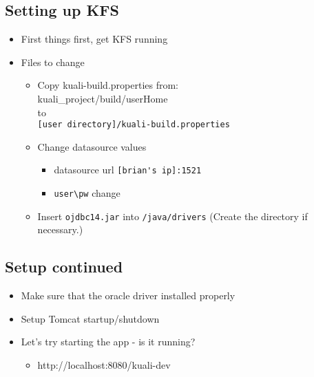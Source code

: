     \W \begin{s5slide}
        \W \section{Setting up KFS}
        \begin{ifhtml}
            \begin{itemize}
                \item First things first, get KFS running
                \item Files to change
                \begin{itemize}
                    \item Copy kuali-build.properties from: \\
                    kuali_project/build/userHome  \\
                    to \\
                    \verb|[user directory]/kuali-build.properties| \\
                    \item Change datasource values
                    	\begin{itemize}
                    		\item datasource url \- \verb|[brian's ip]:1521|
                    		\item \verb|user\pw| change
                    	\end{itemize}
                    \item Insert \verb|ojdbc14.jar| into \verb|/java/drivers| (Create the directory if necessary.)
                \end{itemize}
            \end{itemize}
        \end{ifhtml} 
    \W \end{s5slide}
    \W \begin{s5slide}
        \W \section{Setup continued}
        \begin{ifhtml}
            \begin{itemize}
                \item Make sure that the oracle driver installed properly
                \item Setup Tomcat startup/shutdown
                \item Let's try starting the app - is it running?
                \begin{itemize}
                    \item http://localhost:8080/kuali-dev
                \end{itemize}
            \end{itemize}
        \end{ifhtml} 
    \W \end{s5slide}
